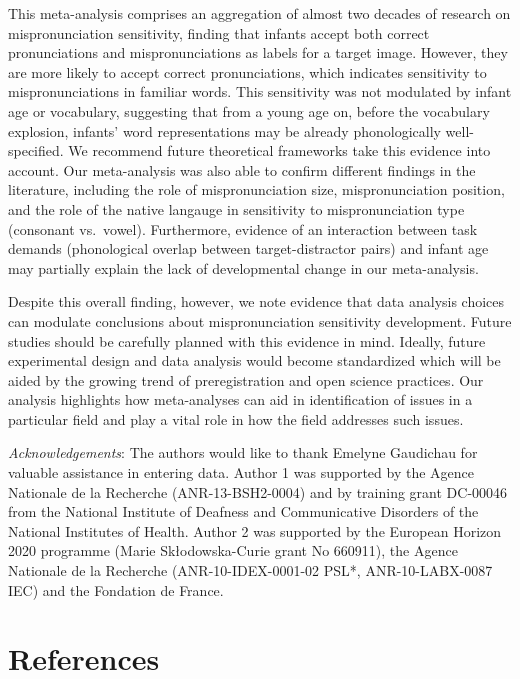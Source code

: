 \documentclass[man]{apa6}
\begin{document}
This meta-analysis comprises an aggregation of almost two decades of research on mispronunciation sensitivity, finding that infants accept both correct pronunciations and mispronunciations as labels for a target image. However, they are more likely to accept correct pronunciations, which indicates sensitivity to mispronunciations in familiar words. This sensitivity was not modulated by infant age or vocabulary, suggesting that from a young age on, before the vocabulary explosion, infants' word representations may be already phonologically well-specified. We recommend future theoretical frameworks take this evidence into account. Our meta-analysis was also able to confirm different findings in the literature, including the role of mispronunciation size, mispronunciation position, and the role of the native langauge in sensitivity to mispronunciation type (consonant vs.~vowel). Furthermore, evidence of an interaction between task demands (phonological overlap between target-distractor pairs) and infant age may partially explain the lack of developmental change in our meta-analysis.

Despite this overall finding, however, we note evidence that data analysis choices can modulate conclusions about mispronunciation sensitivity development. Future studies should be carefully planned with this evidence in mind. Ideally, future experimental design and data analysis would become standardized which will be aided by the growing trend of preregistration and open science practices. Our analysis highlights how meta-analyses can aid in identification of issues in a particular field and play a vital role in how the field addresses such issues.

\newpage

\emph{Acknowledgements}: The authors would like to thank Emelyne Gaudichau for valuable assistance in entering data. Author 1 was supported by the Agence Nationale de la Recherche (ANR-13-BSH2-0004) and by training grant DC-00046 from the National Institute of Deafness and Communicative Disorders of the National Institutes of Health. Author 2 was supported by the European Horizon 2020 programme (Marie Skłodowska-Curie grant No 660911), the Agence Nationale de la Recherche (ANR-10-IDEX-0001-02 PSL*, ANR-10-LABX-0087 IEC) and the Fondation de France.

\newpage

\hypertarget{references}{%
\section{References}\label{references}}
\end{document}
